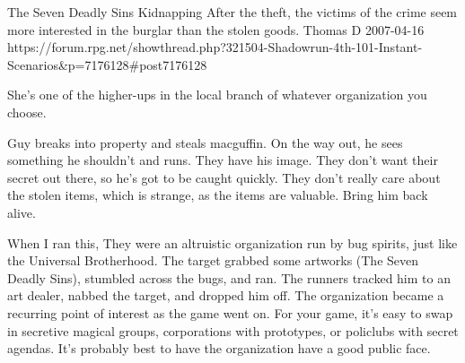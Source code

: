 \begin{scenario}{The Seven Deadly Sins}
	{Kidnapping}
	{After the theft, the victims of the crime seem more interested in the burglar than the stolen goods.}
	{Thomas D}
	{2007-04-16}
	{https://forum.rpg.net/showthread.php?321504-Shadowrun-4th-101-Instant-Scenarios\&p=7176128\#post7176128}

 She's one of the higher-ups in the local branch of whatever organization you choose. 

\synopsis Guy breaks into property and steals macguffin. On the way out, he sees something he shouldn't and runs. They have his image. They don't want their secret out there, so he's got to be caught quickly. They don't really care about the stolen items, which is strange, as the items are valuable. Bring him back alive.

\notes When I ran this, They were an altruistic organization run by bug spirits, just like the Universal Brotherhood. The target grabbed some artworks (The Seven Deadly Sins), stumbled across the bugs, and ran. The runners tracked him to an art dealer, nabbed the target, and dropped him off. The organization became a recurring point of interest as the game went on. For your game, it's easy to swap in secretive magical groups, corporations with prototypes, or policlubs with secret agendas. It's probably best to have the organization have a good public face. 

\end{scenario}